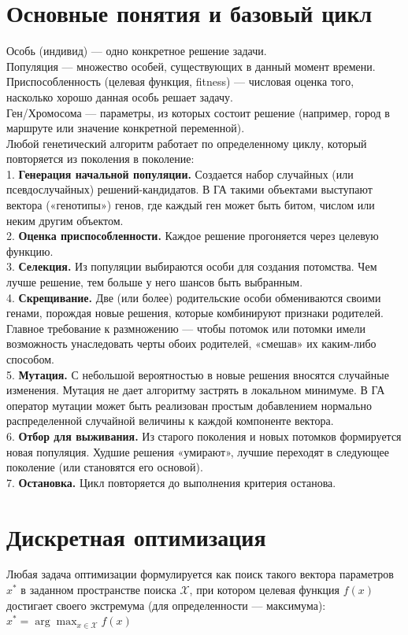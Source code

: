 \section{Основные понятия и базовый цикл}
Особь (индивид) — одно конкретное решение задачи. \\
Популяция — множество особей, существующих в данный момент времени. \\
Приспособленность (целевая функция, fitness) — числовая оценка того, насколько хорошо данная особь решает задачу. \\
Ген/Хромосома — параметры, из которых состоит решение (например, город в маршруте или значение конкретной переменной). \\
Любой генетический алгоритм работает по определенному циклу, который повторяется из поколения в поколение: \\
1. \textbf{Генерация начальной популяции.} Создается набор случайных (или псевдослучайных) решений-кандидатов. В ГА такими объектами выступают вектора («генотипы») генов, где каждый ген может быть битом, числом или неким другим объектом. \\
2. \textbf{Оценка приспособленности.} Каждое решение прогоняется через целевую функцию. \\
3. \textbf{Селекция.} Из популяции выбираются особи для создания потомства. Чем лучше решение, тем больше у него шансов быть выбранным. \\
4. \textbf{Скрещивание.} Две (или более) родительские особи обмениваются своими генами, порождая новые решения, которые комбинируют признаки родителей. Главное требование к размножению — чтобы потомок или потомки имели возможность унаследовать черты обоих родителей, «смешав» их каким-либо способом.\\
5. \textbf{Мутация.} С небольшой вероятностью в новые решения вносятся случайные изменения. Мутация не дает алгоритму застрять в локальном минимуме. В ГА оператор мутации может быть реализован простым добавлением нормально распределенной случайной величины к каждой компоненте вектора. \\
6. \textbf{Отбор для выживания.} Из старого поколения и новых потомков формируется новая популяция. Худшие решения «умирают», лучшие переходят в следующее поколение (или становятся его основой). \\
7. \textbf{Остановка.} Цикл повторяется до выполнения критерия останова.

\section{Дискретная оптимизация}
Любая задача оптимизации формулируется как поиск такого вектора параметров $x^*$ в заданном пространстве поиска $\mathcal{X}$, при котором целевая функция $f(x)$ достигает своего экстремума (для определенности — максимума): \\
$x^* = \arg\max_{x \in \mathcal{X}} f(x)$


